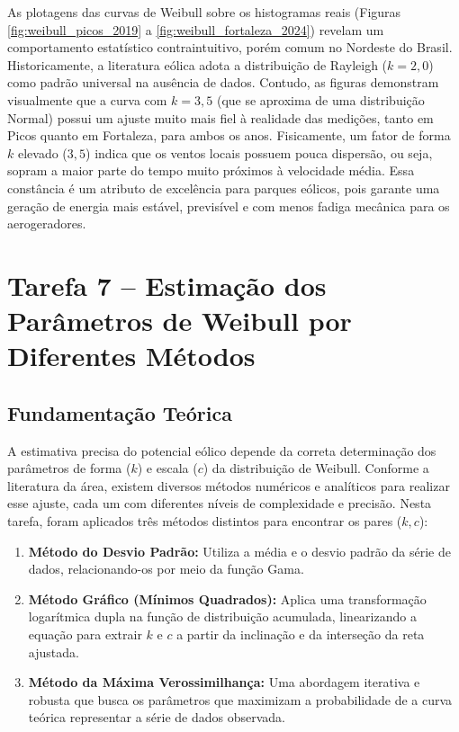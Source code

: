 \documentclass[11pt,a4paper]{article}
\begin{document}
As plotagens das curvas de Weibull sobre os histogramas reais (Figuras \ref{fig:weibull_picos_2019} a \ref{fig:weibull_fortaleza_2024}) revelam um comportamento estatístico contraintuitivo, porém comum no Nordeste do Brasil. Historicamente, a literatura eólica adota a distribuição de Rayleigh ($k=2,0$) como padrão universal na ausência de dados. Contudo, as figuras demonstram visualmente que a curva com $k=3,5$ (que se aproxima de uma distribuição Normal) possui um ajuste muito mais fiel à realidade das medições, tanto em Picos quanto em Fortaleza, para ambos os anos. Fisicamente, um fator de forma $k$ elevado ($3,5$) indica que os ventos locais possuem pouca dispersão, ou seja, sopram a maior parte do tempo muito próximos à velocidade média. Essa constância é um atributo de excelência para parques eólicos, pois garante uma geração de energia mais estável, previsível e com menos fadiga mecânica para os aerogeradores.


\newpage
\section{Tarefa 7 -- Estimação dos Parâmetros de Weibull por Diferentes Métodos}

\subsection{Fundamentação Teórica}
A estimativa precisa do potencial eólico depende da correta determinação dos parâmetros de forma ($k$) e escala ($c$) da distribuição de Weibull. Conforme a literatura da área, existem diversos métodos numéricos e analíticos para realizar esse ajuste, cada um com diferentes níveis de complexidade e precisão. Nesta tarefa, foram aplicados três métodos distintos para encontrar os pares ($k, c$):

\begin{enumerate}
    \item \textbf{Método do Desvio Padrão:} Utiliza a média e o desvio padrão da série de dados, relacionando-os por meio da função Gama.
    \item \textbf{Método Gráfico (Mínimos Quadrados):} Aplica uma transformação logarítmica dupla na função de distribuição acumulada, linearizando a equação para extrair $k$ e $c$ a partir da inclinação e da interseção da reta ajustada.
    \item \textbf{Método da Máxima Verossimilhança:} Uma abordagem iterativa e robusta que busca os parâmetros que maximizam a probabilidade de a curva teórica representar a série de dados observada.
\end{enumerate}
\end{document}

